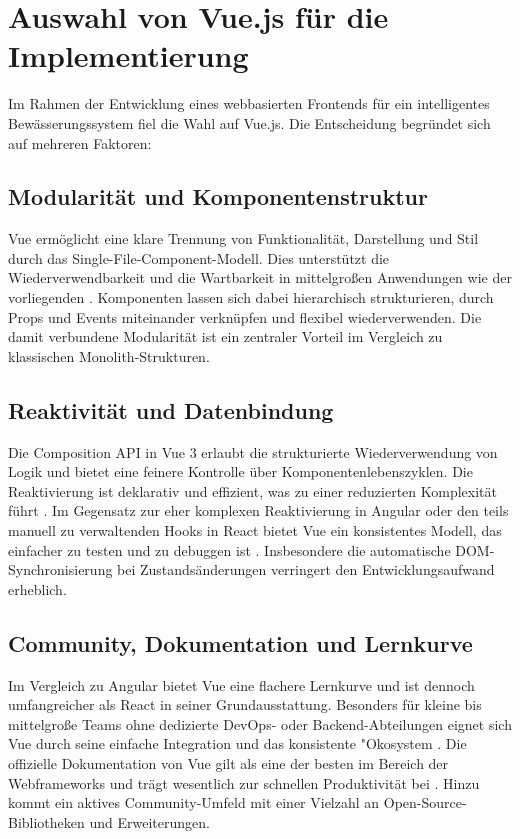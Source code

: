 \section{Auswahl von Vue.js für die Implementierung}
\label{sec:auswahl-vue}

Im Rahmen der Entwicklung eines webbasierten Frontends für ein intelligentes Bewässerungssystem fiel die Wahl auf Vue.js. Die Entscheidung begründet sich auf mehreren Faktoren:

\subsection{Modularität und Komponentenstruktur}
Vue ermöglicht eine klare Trennung von Funktionalität, Darstellung und Stil durch das Single-File-Component-Modell. Dies unterstützt die Wiederverwendbarkeit und die Wartbarkeit in mittelgroßen Anwendungen wie der vorliegenden \cite{VueGuide2024}. Komponenten lassen sich dabei hierarchisch strukturieren, durch Props und Events miteinander verknüpfen und flexibel wiederverwenden. Die damit verbundene Modularität ist ein zentraler Vorteil im Vergleich zu klassischen Monolith-Strukturen.

\subsection{Reaktivität und Datenbindung}
Die Composition API in Vue 3 erlaubt die strukturierte Wiederverwendung von Logik und bietet eine feinere Kontrolle über Komponentenlebenszyklen. Die Reaktivierung ist deklarativ und effizient, was zu einer reduzierten Komplexität führt \cite{VueCompositionAPI2020}. Im Gegensatz zur eher komplexen Reaktivierung in Angular oder den teils manuell zu verwaltenden Hooks in React bietet Vue ein konsistentes Modell, das einfacher zu testen und zu debuggen ist \cite{VueReactivity2016}. Insbesondere die automatische DOM-Synchronisierung bei Zustandsänderungen verringert den Entwicklungsaufwand erheblich.

\subsection{Community, Dokumentation und Lernkurve}
Im Vergleich zu Angular bietet Vue eine flachere Lernkurve und ist dennoch umfangreicher als React in seiner Grundausstattung. Besonders für kleine bis mittelgroße Teams ohne dedizierte DevOps- oder Backend-Abteilungen eignet sich Vue durch seine einfache Integration und das konsistente "{O}kosystem \cite{Allotey2023}. Die offizielle Dokumentation von Vue gilt als eine der besten im Bereich der Webframeworks und trägt wesentlich zur schnellen Produktivität bei \cite{VueGuide2024}. Hinzu kommt ein aktives Community-Umfeld mit einer Vielzahl an Open-Source-Bibliotheken und Erweiterungen.

